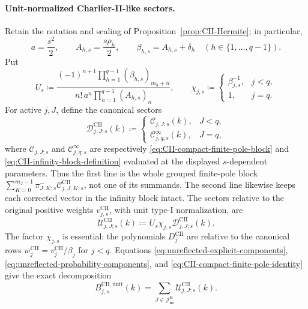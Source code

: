 \documentclass[10pt]{amsart}
\newcommand{\mm}{\boldsymbol m}
\theoremstyle{plain}
\theoremstyle{definition}
\theoremstyle{remark}
\begin{document}
\paragraph{Unit-normalized Charlier-II-like sectors.}
Retain the notation and scaling of
Proposition~\ref{prop:CII-Hermite}; in particular,
\[
 a=\frac{s^2}{2},\qquad
 A_{h,s}=\frac{s\rho_h}{2},\qquad
 \beta_{h,s}=A_{h,s}+\delta_h
 \quad(h\in\{1,\ldots,q-1\}).
\]
Put
\begin{equation}
 U_s\coloneq
 \frac{(-1)^{n+1}
 \prod_{h=1}^{q-1}
 (\beta_{h,s})_{m_h+n}}
 {n!\,a^n
 \prod_{h=1}^{q-1}(A_{h,s})_n},
 \qquad
 \chi_{j,s}\coloneq
 \begin{cases}
  \beta_{j,s}^{-1},&j<q,\\
  1,&j=q.
 \end{cases}
 \label{eq:CII-Hermite-sector-unit-factor}
\end{equation}
For active \(j,J\), define the canonical sectors
\begin{equation}
 \mathscr D_{j,J;s}^{\mathrm{CII}}(k)\coloneq
 \begin{cases}
  \mathscr C_{j,J;s}(k),&J<q,\\[2mm]
  \mathscr C_{j,q;s}^{\infty}(k),&J=q,
 \end{cases}
 \label{eq:CII-Hermite-canonical-sectors}
\end{equation}
where \(\mathscr C_{j,J;s}\) and
\(\mathscr C_{j,q;s}^{\infty}\) are respectively
\eqref{eq:CII-compact-finite-pole-block} and
\eqref{eq:CII-infinity-block-definition} evaluated at the displayed
\(s\)-dependent parameters. Thus the first line is the whole grouped
finite-pole block
\(\sum_{K=0}^{m_J-1}\pi_{J,K;s}^{-}
\mathcal C_{j,J,K;s}^{\mathrm{CII}}\), not one of its summands.
The second line likewise keeps each corrected vector in the infinity block
intact. The sectors relative
to the original positive weights \(v_{j,s}^{\mathrm{CII}}\), with unit
type-I normalization, are
\begin{equation}
 \mathscr U_{j,J;s}^{\mathrm{CII}}(k)
 \coloneq U_s\chi_{j,s}
 \mathscr D_{j,J;s}^{\mathrm{CII}}(k).
 \label{eq:CII-Hermite-unit-sectors}
\end{equation}
The factor \(\chi_{j,s}\) is essential: the polynomials
\(D_j^{\mathrm{CII}}\) are relative to the canonical rows
\(w_j^{\mathrm{CII}}=v_j^{\mathrm{CII}}/\beta_j\) for \(j<q\).
Equations \eqref{eq:unreflected-explicit-components},
\eqref{eq:unreflected-probability-components}, and
\eqref{eq:CII-compact-finite-pole-identity} give the exact decomposition
\begin{equation}
 B_{j,s}^{\mathrm{CII,unit}}(k)
 =\sum_{J\in\mathcal J_{\mm}^{\mathrm H}}
 \mathscr U_{j,J;s}^{\mathrm{CII}}(k).
 \label{eq:CII-Hermite-unit-sector-decomposition}
\end{equation}
\end{document}
